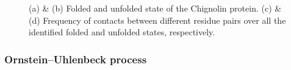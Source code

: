 \documentclass
[
    a4paper,
    DIV=11,
    abstract=true,
    11pt,
]
{scrartcl}
\theoremstyle{definition}
\begin{document}
\begin{figure}
\begin{minipage}[t]{0.4\linewidth}
    \end{minipage}
    \begin{minipage}[t]{0.4\linewidth}
    \end{minipage}
    \caption{(a) \& (b) Folded and unfolded state of the Chignolin protein. (c) \& (d) Frequency of contacts between different residue pairs over all the identified folded and unfolded states, respectively.}
    \label{fig:chig_visuals}
\end{figure}

\subsubsection{Ornstein--Uhlenbeck process}
\end{document}
